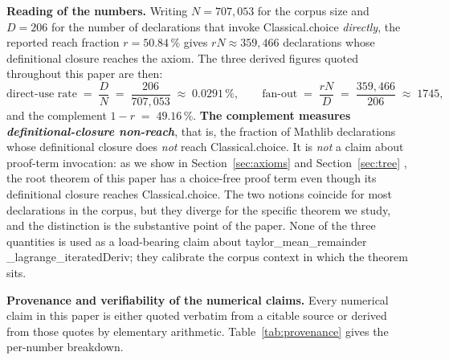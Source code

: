 \documentclass[11pt,reqno]{amsart}
\begin{document}
\smallskip\noindent\textbf{Reading of the numbers.} Writing $N = 707{,}053$
for the corpus size and $D = 206$ for the number of declarations that invoke 
\textsf{Classical\allowbreak.choice} \emph{directly}, the reported reach
fraction $r = 50.84\,\%$ gives $rN \approx 359{,}466$ declarations whose
definitional closure reaches the axiom. The three derived figures quoted
throughout this paper are then: 
\begin{equation*}
\text{direct-use rate} \;=\;\frac{D}{N} \;=\;\frac{206}{707{,}053}
\;\approx\;0.0291\,\%, \qquad \text{fan-out} \;=\;\frac{rN}{D} \;=\;\frac{359%
{,}466}{206} \;\approx\;1745, 
\end{equation*}
and the complement $1 - r \;=\; 49.16\,\%$. \textbf{The complement measures 
\emph{definitional-closure non-reach}}, that is, the fraction of Mathlib
declarations whose definitional closure does \emph{not} reach \textsf{%
Classical\allowbreak.choice}. It is \emph{not} a claim about proof-term
invocation: as we show in Section~\ref{sec:axioms} and Section~\ref{sec:tree}%
, the root theorem of this paper has a choice-free proof term even though
its definitional closure reaches \textsf{Classical\allowbreak.choice}. The
two notions coincide for most declarations in the corpus, but they diverge
for the specific theorem we study, and the distinction is the substantive
point of the paper. None of the three quantities is used as a load-bearing
claim about \textsf{taylor\allowbreak\_mean\allowbreak\_remainder\allowbreak%
\_lagrange\allowbreak \_iterated\allowbreak Deriv}; they calibrate the
corpus context in which the theorem sits.

\smallskip\noindent\textbf{Provenance and verifiability of the numerical
claims.} Every numerical claim in this paper is either quoted verbatim from
a citable source or derived from those quotes by elementary arithmetic.
Table~\ref{tab:provenance} gives the per-number breakdown.
\end{document}
